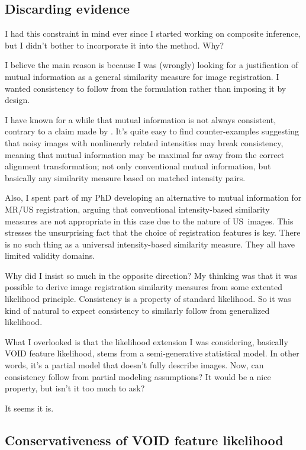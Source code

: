 \documentclass[english]{scrartcl}
\begin{document}
\subsection{Discarding evidence}

I had this constraint in mind ever since I started working on composite inference, but I didn't bother to incorporate it into the method. Why?

I believe the main reason is because I was (wrongly) looking for a justification of mutual information as a general similarity measure for image registration. I wanted consistency to follow from the formulation rather than imposing it by design.

I have known for a while that mutual information is not always consistent, contrary to a claim made by \cite{Zollei-09}. It's quite easy to find counter-examples suggesting that noisy images with nonlinearly related intensities may break consistency, meaning that mutual information may be maximal far away from the correct alignment transformation; not only conventional mutual information, but basically any similarity measure based on matched intensity pairs.

Also, I spent part of my PhD developing an alternative to mutual information for MR/US registration, arguing that conventional intensity-based similarity measures are not appropriate in this case due to the nature of US~images. This stresses the unsurprising fact that the choice of registration features is key. There is no such thing as a universal intensity-based similarity measure. They all have limited validity domains.

Why did I insist so much in the opposite direction? My thinking was that it was possible to derive image registration similarity measures from some extented likelihood principle. Consistency is a property of standard likelihood. So it was kind of natural to expect consistency to similarly follow from generalized likelihood.

What I overlooked is that the likelihood extension I was considering, basically VOID feature likelihood, stems from a semi-generative statistical model. In other words, it's a partial model that doesn't fully describe images. Now, can consistency follow from partial modeling assumptions? It would be a nice property, but isn't it too much to ask?

It seems it is.

\subsection{Conservativeness of VOID feature likelihood}
\end{document}
